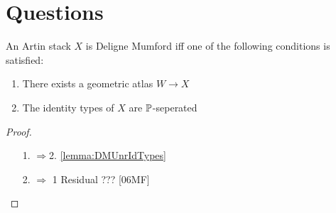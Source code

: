 \documentclass{article}
\begin{document}
\section{Questions}
\begin{theorem}[TODO]
	An Artin stack $X$ is Deligne Mumford iff one of the following conditions is satisfied:
	\begin{enumerate}
		\item There exists a geometric atlas $W \to X$
		\item The identity types of $X$ are $\mathbb{P}$-seperated
	\end{enumerate}
\end{theorem}
\begin{proof}
	\begin{enumerate}
		\item [1. $\Rightarrow $2.] \ref{lemma:DMUnrIdTypes}
		\item [2. $\Rightarrow$ 1] Residual ??? [06MF]
	\end{enumerate}
\end{proof}



\end{document}
